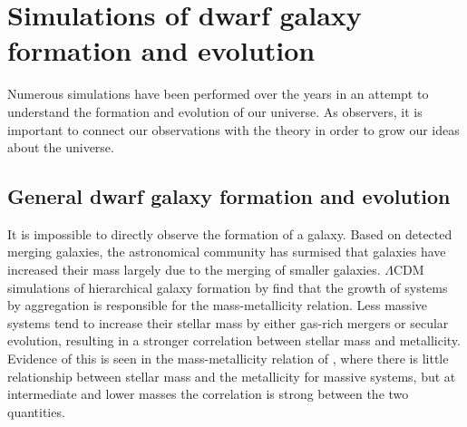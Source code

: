 \chapter[Simulations]{Simulations of dwarf galaxy formation and evolution}


Numerous simulations have been performed over the years in an attempt to 
understand the formation and evolution of our universe.  As observers, it is 
important to connect our observations with the theory in order to grow our ideas 
about the universe.


\section{General dwarf galaxy formation and evolution}

It is impossible to directly observe the formation of a galaxy.  Based on 
detected merging galaxies, the astronomical community has surmised that galaxies 
have increased their mass largely due to the merging of smaller galaxies.  
$\Lambda$CDM simulations of hierarchical galaxy formation by \cite{deRossi07} 
find that the growth of systems by aggregation is responsible for the 
mass-metallicity relation.  Less massive systems tend to increase their stellar 
mass by either gas-rich mergers or secular evolution, resulting in a stronger 
correlation between stellar mass and metallicity.  Evidence of this is seen in 
the mass-metallicity relation of \cite{Tremonti04}, where there is little 
relationship between stellar mass and the metallicity for massive systems, but 
at intermediate and lower masses the correlation is strong between the two 
quantities.

